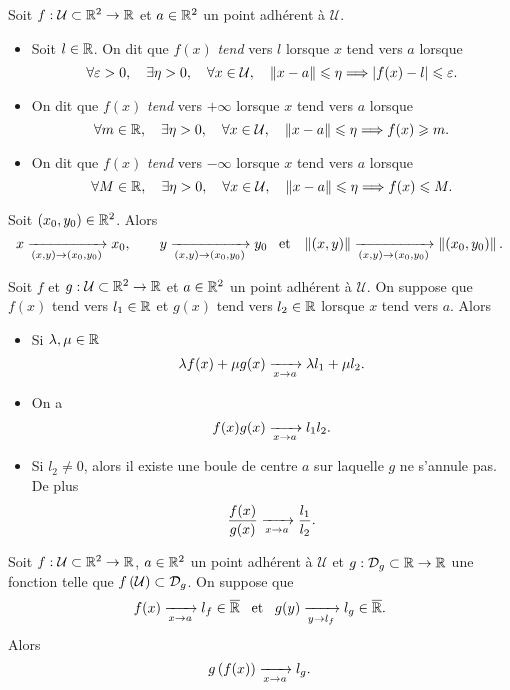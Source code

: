 \documentclass{magnolia}
\begin{document}
\begin{definition}
Soit $f:\mathcal{U}\subset\mathbb{R}^2\to\mathbb{R}$ et $a\in\mathbb{R}^2$ un point adhérent à $\mathcal{U}$.
\begin{itemize}
\item Soit $l\in\mathbb{R}$. On dit que $f(x)$ \emph{tend} vers $l$ lorsque $x$ tend
  vers $a$ lorsque
  \[\forall \varepsilon>0 ,\quad \exists \eta>0 ,\quad \forall x\in\mathcal{U}
    ,\quad \left\|x-a\right\|\leqslant\eta \Longrightarrow \left|f(x)-l\right|\leqslant\varepsilon.\]
\item On dit que $f(x)$ \emph{tend} vers $+\infty$ lorsque $x$ tend vers $a$
  lorsque
  \[\forall m\in\mathbb{R} ,\quad \exists \eta>0 ,\quad \forall x\in\mathcal{U}
    ,\quad \left\|x-a\right\|\leqslant\eta \Longrightarrow f(x)\geqslant m.\]
\item On dit que $f(x)$ \emph{tend} vers $-\infty$ lorsque $x$ tend vers $a$
  lorsque
  \[\forall M\in\mathbb{R} ,\quad \exists \eta>0 ,\quad \forall x\in\mathcal{U}
    ,\quad \left\|x-a\right\|\leqslant\eta \Longrightarrow f(x)\leqslant M.\]
\end{itemize}
\end{definition}

\begin{remarqueUnique}
\remarque Soit $\left(x_0,y_0\right)\in\mathbb{R}^2$. Alors
  \[x\xrightarrow[\left(x,y\right)\rightarrow \left(x_0,y_0\right)]{} x_0, \qquad
    y\xrightarrow[\left(x,y\right)\rightarrow \left(x_0,y_0\right)]{} y_0 \quad\!\text{et}\quad\!
    \left\|\left(x,y\right)\right\| \xrightarrow[\left(x,y\right)\rightarrow \left(x_0,y_0\right)]{} \left\|\left(x_0,y_0\right)\right\|.\]
\end{remarqueUnique}

\begin{proposition}
Soit $f$ et $g:\mathcal{U}\subset\mathbb{R}^2\to\mathbb{R}$ 
 et $a\in\mathbb{R}^2$ un point adhérent à $\mathcal{U}$. On suppose que $f(x)$
tend vers $l_1\in\mathbb{R}$ et $g(x)$ tend vers $l_2\in\mathbb{R}$ lorsque $x$ tend vers $a$. Alors
\begin{itemize}
\item Si $\lambda,\mu\in\mathbb{R}$
  \[\lambda f(x)+\mu g(x)\xrightarrow[x\rightarrow a]{} \lambda l_1+\mu l_2.\]
\item On a
  \[f(x)g(x)\xrightarrow[x\rightarrow a]{} l_1 l_2.\]
\item Si $l_2\neq 0$, alors il existe une boule de centre $a$ sur
  laquelle $g$ ne s'annule pas. De plus
  \[\frac{f(x)}{g(x)}\xrightarrow[x\rightarrow a]{}\frac{l_1}{l_2}.\]
\end{itemize}
\end{proposition}

\begin{proposition}
Soit $f:\mathcal{U}\subset\mathbb{R}^2\to\mathbb{R}$, $a\in\mathbb{R}^2$ un
point adhérent à $\mathcal{U}$ et $g:\mathcal{D}_g\subset\mathbb{R}\to\mathbb{R}$ une fonction telle que
$f\left(\mathcal{U}\right)\subset\mathcal{D}_g$. On
suppose que
\[f(x)\xrightarrow[x\rightarrow a]{} l_f\in\overline{\mathbb{R}} \quad\!\text{et}\quad\!
  g(y)\xrightarrow[y\rightarrow l_f]{} l_g\in\overline{\mathbb{R}}.\]
Alors
\[g\left(f(x)\right)\xrightarrow[x\rightarrow a]{} l_g.\]
\end{proposition}
\end{document}
